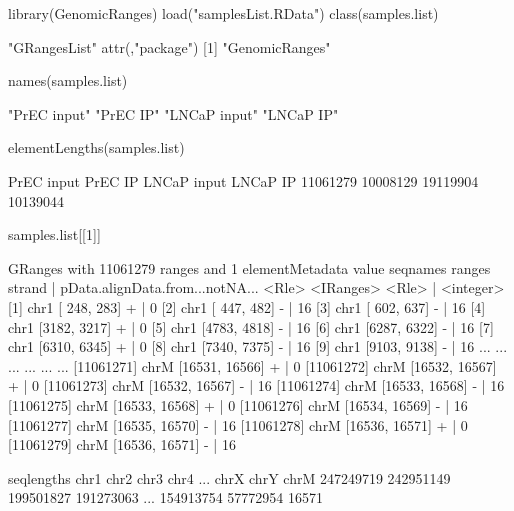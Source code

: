 \begin{Schunk}
\begin{Sinput}
 library(GenomicRanges)
 load("samplesList.RData")
 class(samples.list)
\end{Sinput}
\begin{Soutput}
[1] "GRangesList"
attr(,"package")
[1] "GenomicRanges"
\end{Soutput}
\begin{Sinput}
 names(samples.list)
\end{Sinput}
\begin{Soutput}
[1] "PrEC input"  "PrEC IP"     "LNCaP input" "LNCaP IP"   
\end{Soutput}
\begin{Sinput}
 elementLengths(samples.list)
\end{Sinput}
\begin{Soutput}
 PrEC input     PrEC IP LNCaP input    LNCaP IP 
   11061279    10008129    19119904    10139044 
\end{Soutput}
\begin{Sinput}
 samples.list[[1]]
\end{Sinput}
\begin{Soutput}
GRanges with 11061279 ranges and 1 elementMetadata value
           seqnames         ranges strand   | pData.alignData.from...notNA...
              <Rle>      <IRanges>  <Rle>   |                       <integer>
       [1]     chr1   [ 248,  283]      +   |                               0
       [2]     chr1   [ 447,  482]      -   |                              16
       [3]     chr1   [ 602,  637]      -   |                              16
       [4]     chr1   [3182, 3217]      +   |                               0
       [5]     chr1   [4783, 4818]      -   |                              16
       [6]     chr1   [6287, 6322]      -   |                              16
       [7]     chr1   [6310, 6345]      +   |                               0
       [8]     chr1   [7340, 7375]      -   |                              16
       [9]     chr1   [9103, 9138]      -   |                              16
       ...      ...            ...    ... ...                             ...
[11061271]     chrM [16531, 16566]      +   |                               0
[11061272]     chrM [16532, 16567]      +   |                               0
[11061273]     chrM [16532, 16567]      -   |                              16
[11061274]     chrM [16533, 16568]      -   |                              16
[11061275]     chrM [16533, 16568]      +   |                               0
[11061276]     chrM [16534, 16569]      -   |                              16
[11061277]     chrM [16535, 16570]      -   |                              16
[11061278]     chrM [16536, 16571]      +   |                               0
[11061279]     chrM [16536, 16571]      -   |                              16

seqlengths
      chr1      chr2      chr3      chr4 ...      chrX      chrY      chrM
 247249719 242951149 199501827 191273063 ... 154913754  57772954     16571
\end{Soutput}
\end{Schunk}

